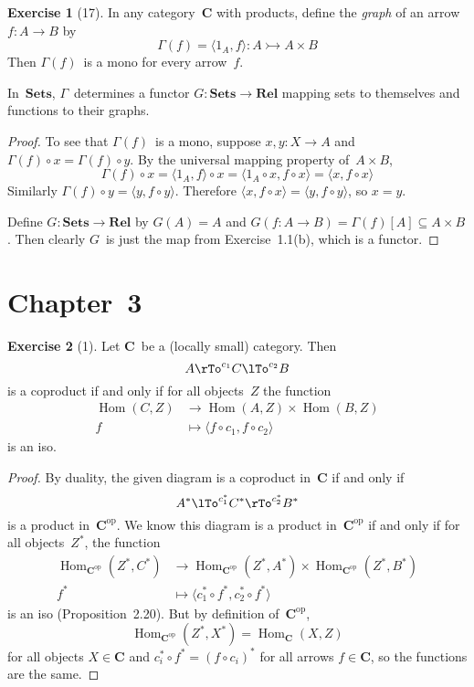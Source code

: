 \documentclass[letterpaper,12pt]{article}
\newcommand{\mono}{\rightarrowtail}
\newcommand{\after}{\circ}
\DeclareMathOperator{\Hom}{Hom}
\newcommand{\pair}[2]{\langle{#1},{#2}\rangle}
\renewcommand{\star}[1]{#1^{*}}
\newcommand{\cat}[1]{\mathbf{#1}}
\newcommand{\dual}[1]{#1^{\mathrm{op}}}
\newcommand{\2}{\cat{2}}
\newcommand{\C}{\cat{C}}
\newcommand{\Cop}{\dual{\C}}
\newcommand{\Rel}{\cat{Rel}}
\newcommand{\Sets}{\cat{Sets}}
\theoremstyle{definition}
\newtheorem*{exer}{Exercise}
\theoremstyle{remark}
\theoremstyle{direction}
\begin{document}
\begin{exer}[17]
In any category~\(\C\) with products, define the \emph{graph} of an arrow \(f:A\to B\) by
\[\Gamma(f)=\pair{1_A}{f}:A\mono A\times B\]
Then \(\Gamma(f)\)~is a mono for every arrow~\(f\).

In~\(\Sets\), \(\Gamma\)~determines a functor \(G:\Sets\to\Rel\) mapping sets to themselves and functions to their graphs.
\end{exer}
\begin{proof}
To see that \(\Gamma(f)\)~is a mono, suppose \(x,y:X\to A\) and \(\Gamma(f)\after x=\Gamma(f)\after y\). By the universal mapping property of~\(A\times B\),
\[\Gamma(f)\after x=\pair{1_A}{f}\after x=\pair{1_A\after x}{f\after x}=\pair{x}{f\after x}\]
Similarly \(\Gamma(f)\after y=\pair{y}{f\after y}\). Therefore \(\pair{x}{f\after x}=\pair{y}{f\after y}\), so \(x=y\).

Define \(G:\Sets\to\Rel\) by \(G(A)=A\) and \(G(f:A\to B)=\Gamma(f)[A]\subseteq A\times B\). Then clearly \(G\)~is just the map from Exercise~1.1(b), which is a functor.
\end{proof}

\section*{Chapter~3}
\begin{exer}[1]
Let \(\C\)~be a (locally small) category. Then
\[A\rTo^{c_1}C\lTo^{c_2}B\]
is a coproduct if and only if for all objects~\(Z\) the function
\begin{align*}
\Hom(C,Z)&\to\Hom(A,Z)\times\Hom(B,Z)\\
f&\mapsto\pair{f\after c_1}{f\after c_2}
\end{align*}
is an iso.
\end{exer}
\begin{proof}
By duality, the given diagram is a coproduct in~\(\C\) if and only if
\[\star{A}\lTo^{\star{c_1}}\star{C}\rTo^{\star{c_2}}\star{B}\]
is a product in~\(\Cop\). We know this diagram is a product in~\(\Cop\) if and only if for all objects~\(\star{Z}\), the function
\begin{align*}
\Hom_{\Cop}(\star{Z},\star{C})&\to\Hom_{\Cop}(\star{Z},\star{A})\times\Hom_{\Cop}(\star{Z},\star{B})\\
\star{f}&\mapsto\pair{\star{c_1}\after\star{f}}{\star{c_2}\after\star{f}}
\end{align*}
is an iso (Proposition~2.20). But by definition of~\(\Cop\),
\[\Hom_{\Cop}(\star{Z},\star{X})=\Hom_{\C}(X,Z)\]
for all objects \(X\in\C\) and \(\star{c_i}\after\star{f}=\star{(f\after c_i)}\) for all arrows \(f\in\C\), so the functions are the same.
\end{proof}
\end{document}
